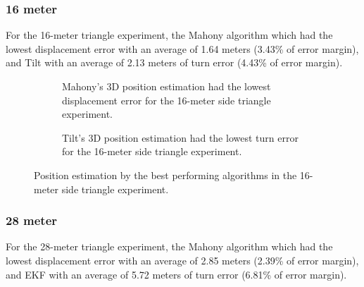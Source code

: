 \subsubsection{16 meter}

For the 16-meter triangle experiment, the Mahony algorithm which had the lowest displacement error with an average of 1.64 meters (3.43\% of error margin), and Tilt with an average of 2.13 meters of turn error (4.43\% of error margin).

\begin{figure}[!h]
    \centering
    
\end{figure}

\begin{figure}[!h]
    \centering
    \begin{subfigure}{0.49\textwidth}
        \centering
        \resizebox{1\linewidth}{!}{}
        \caption{Mahony's 3D position estimation had the lowest displacement error for the 16-meter side triangle experiment.}
        \label{fig:triangle16_2D}
    \end{subfigure}
    \begin{subfigure}{0.49\textwidth}
        \centering
        \resizebox{1\linewidth}{!}{}
        \caption{Tilt's 3D position estimation had the lowest turn error for the 16-meter side triangle experiment.}
        \label{fig:triangle16_3D}
    \end{subfigure}
    \caption{Position estimation by the best performing algorithms in the 16-meter side triangle experiment.}
    \label{fig:triangle16}
\end{figure}

\subsubsection{28 meter}

For the 28-meter triangle experiment, the Mahony algorithm which had the lowest displacement error with an average of 2.85 meters (2.39\% of error margin), and EKF with an average of 5.72 meters of turn error (6.81\% of error margin).

\begin{figure}[!h]
    \centering
    
\end{figure}

